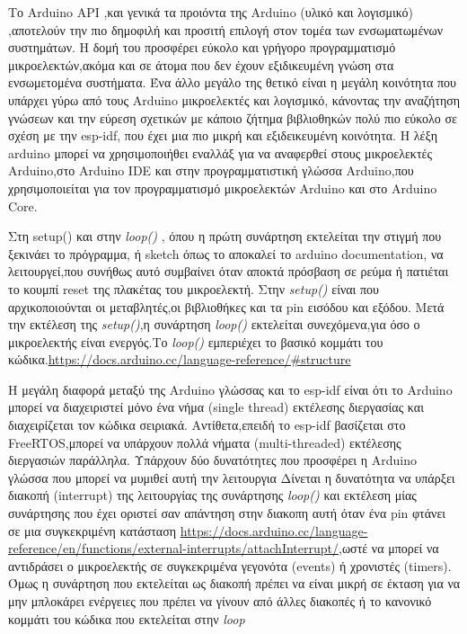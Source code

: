Το Arduino API ,και γενικά τα προιόντα της Arduino (υλικό και λογισμικό) ,αποτελούν την πιο δημοφιλή και προσιτή επιλογή στον τομέα των ενσωματωμένων συστημάτων.
Η δομή του προσφέρει εύκολο και γρήγορο προγραμματισμό μικροελεκτών,ακόμα και σε άτομα που δεν έχουν εξιδικευμένη γνώση στα ενσωμετομένα συστήματα. Ένα άλλο μεγάλο της θετικό είναι η μεγάλη κοινότητα που υπάρχει γύρω από τους Arduino μικροελεκτές και λογισμικό, κάνοντας την αναζήτηση γνώσεων και την εύρεση σχετικών με κάποιο ζήτημα βιβλιοθηκών πολύ πιο εύκολο σε σχέση με την esp-idf, που έχει μια πιο μικρή και εξιδεικευμένη κοινότητα.
Η λέξη arduino  μπορεί να χρησιμοποιήθει εναλλάξ για να αναφερθεί στους μικροελεκτές Arduino,στο Arduino IDE και στην προγραμματιστική γλώσσα Arduino,που χρησιμοποιείται για τον προγραμματισμό μικροελεκτών Arduino και στο Arduino Core.

Στη \textit{}{setup()} και στην \textit{loop()} , όπου η πρώτη συνάρτηση εκτελείται την στιγμή που ξεκινάει το πρόγραμμα, ή sketch όπως το αποκαλεί το arduino documentation, να λειτουργεί,που συνήθως αυτό συμβαίνει όταν αποκτά πρόσβαση σε ρεύμα ή πατιέται το κουμπί reset της πλακέτας του μικροελεκτή. Στην \textit{setup()} είναι που αρχικοποιούνται οι μεταβλητές,οι βιβλιοθήκες και τα pin εισόδου και εξόδου. Μετά την εκτέλεση της \textit{setup()},η συνάρτηση \textit{loop()} εκτελείται συνεχόμενα,για όσο ο μικροελεκτής είναι ενεργός.Το \textit{loop()} εμπεριέχει το βασικό κομμάτι του κώδικα.\url{https://docs.arduino.cc/language-reference/#structure} 

Η μεγάλη διαφορά μεταξύ της Arduino γλώσσας και το esp-idf είναι ότι το Arduino μπορεί να διαχειριστεί μόνο ένα νήμα 
(single thread) εκτέλεσης διεργασίας και διαχειρίζεται τον κώδικα σειριακά. 
Αντίθετα,επειδή το esp-idf βασίζεται στο FreeRTOS,μπορεί να υπάρχουν πολλά νήματα (multi-threaded) εκτέλεσης διεργασιών παράλληλα.
Υπάρχουν δύο δυνατότητες που προσφέρει η Arduino γλώσσα που μπορεί να μυμιθεί αυτή την λειτουργια
Δίνεται η δυνατότητα να υπάρξει διακοπή (interrupt) της λειτουργίας της συνάρτησης \textit{loop()} και εκτέλεση μίας συνάρτησης που έχει οριστεί σαν απάντηση στην διακοπη αυτή όταν ένα pin φτάνει σε μια συγκεκριμένη κατάσταση \url{https://docs.arduino.cc/language-reference/en/functions/external-interrupts/attachInterrupt/},ωστέ να μπορεί να αντιδράσει ο μικροελεκτής σε συγκεκριμένα γεγονότα (events) ή χρονιστές (timers). 
Όμως η συνάρτηση που εκτελείται ως διακοπή πρέπει να είναι μικρή σε έκταση για να μην μπλοκάρει ενέργειες που πρέπει να γίνουν από άλλες διακοπές ή το κανονικό κομμάτι του κώδικα που εκτελείται στην \textit{loop}

